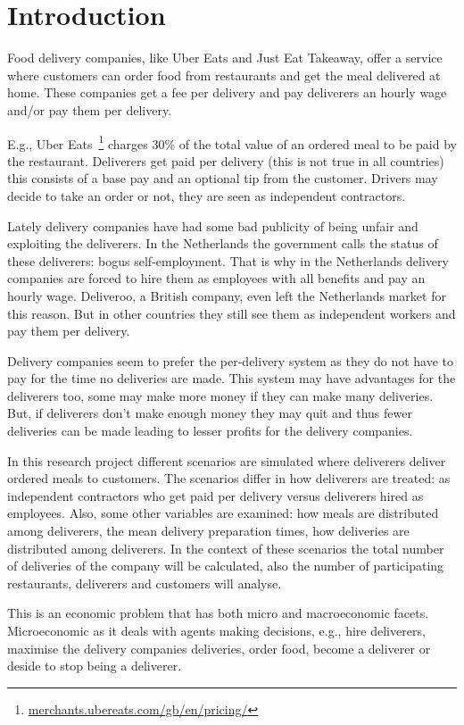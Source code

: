 
\section{Introduction}\label{sec:introduction}

Food delivery companies, like Uber Eats and Just Eat Takeaway, offer a service where customers can order food from restaurants and get the meal delivered at home.
These companies get a fee per delivery and pay deliverers an hourly wage and/or pay them per delivery.

E.g., Uber Eats~\footnote{\url{merchants.ubereats.com/gb/en/pricing/}} charges 30\% of the total value of an ordered meal to be paid by the restaurant.
Deliverers get paid per delivery (this is not true in all countries) this consists of a base pay and an optional tip from the customer.
Drivers may decide to take an order or not, they are seen as independent contractors.

Lately delivery companies have had some bad publicity of being unfair and exploiting the deliverers.
In the Netherlands the government calls the status of these deliverers: bogus self-employment.
That is why in the Netherlands delivery companies are forced to hire them as employees with all benefits and pay an hourly wage.
Deliveroo, a British company, even left the Netherlands market for this reason.
But in other countries they still see them as independent workers and pay them per delivery.

Delivery companies seem to prefer the per-delivery system as they do not have to pay for the time no deliveries are made.
This system may have advantages for the deliverers too, some may make more money if they can make many deliveries.
But, if deliverers don't make enough money they may quit and thus fewer deliveries can be made leading to lesser profits for the delivery companies.

In this research project different scenarios are simulated where deliverers deliver ordered meals to customers.
The scenarios differ in how deliverers are treated: as independent contractors who get paid per delivery versus
deliverers hired as employees.
Also, some other variables are examined: how meals are distributed among deliverers, the mean delivery preparation times, how deliveries are distributed among deliverers.
In the context of these scenarios the total number of deliveries of the company will be calculated, also the number of participating restaurants, deliverers and customers will analyse.

This is an economic problem that has both micro and macroeconomic facets.
Microeconomic as it deals with agents making decisions, e.g., hire deliverers, maximise the delivery companies deliveries, order food, become a deliverer or deside to stop being a deliverer.

